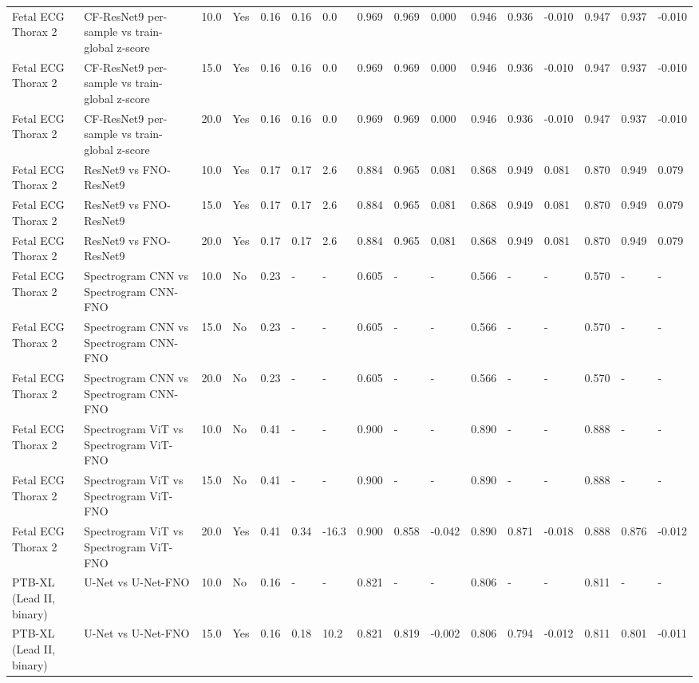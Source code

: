 \begin{longtable}{llllllllllllllll}
Fetal ECG Thorax 2 & CF-ResNet9 per-sample vs train-global z-score & 10.0 & Yes & 0.16 & 0.16 & 0.0 & 0.969 & 0.969 & 0.000 & 0.946 & 0.936 & -0.010 & 0.947 & 0.937 & -0.010 \\
Fetal ECG Thorax 2 & CF-ResNet9 per-sample vs train-global z-score & 15.0 & Yes & 0.16 & 0.16 & 0.0 & 0.969 & 0.969 & 0.000 & 0.946 & 0.936 & -0.010 & 0.947 & 0.937 & -0.010 \\
Fetal ECG Thorax 2 & CF-ResNet9 per-sample vs train-global z-score & 20.0 & Yes & 0.16 & 0.16 & 0.0 & 0.969 & 0.969 & 0.000 & 0.946 & 0.936 & -0.010 & 0.947 & 0.937 & -0.010 \\
Fetal ECG Thorax 2 & ResNet9 vs FNO-ResNet9 & 10.0 & Yes & 0.17 & 0.17 & 2.6 & 0.884 & 0.965 & 0.081 & 0.868 & 0.949 & 0.081 & 0.870 & 0.949 & 0.079 \\
Fetal ECG Thorax 2 & ResNet9 vs FNO-ResNet9 & 15.0 & Yes & 0.17 & 0.17 & 2.6 & 0.884 & 0.965 & 0.081 & 0.868 & 0.949 & 0.081 & 0.870 & 0.949 & 0.079 \\
Fetal ECG Thorax 2 & ResNet9 vs FNO-ResNet9 & 20.0 & Yes & 0.17 & 0.17 & 2.6 & 0.884 & 0.965 & 0.081 & 0.868 & 0.949 & 0.081 & 0.870 & 0.949 & 0.079 \\
Fetal ECG Thorax 2 & Spectrogram CNN vs Spectrogram CNN-FNO & 10.0 & No & 0.23 & - & - & 0.605 & - & - & 0.566 & - & - & 0.570 & - & - \\
Fetal ECG Thorax 2 & Spectrogram CNN vs Spectrogram CNN-FNO & 15.0 & No & 0.23 & - & - & 0.605 & - & - & 0.566 & - & - & 0.570 & - & - \\
Fetal ECG Thorax 2 & Spectrogram CNN vs Spectrogram CNN-FNO & 20.0 & No & 0.23 & - & - & 0.605 & - & - & 0.566 & - & - & 0.570 & - & - \\
Fetal ECG Thorax 2 & Spectrogram ViT vs Spectrogram ViT-FNO & 10.0 & No & 0.41 & - & - & 0.900 & - & - & 0.890 & - & - & 0.888 & - & - \\
Fetal ECG Thorax 2 & Spectrogram ViT vs Spectrogram ViT-FNO & 15.0 & No & 0.41 & - & - & 0.900 & - & - & 0.890 & - & - & 0.888 & - & - \\
Fetal ECG Thorax 2 & Spectrogram ViT vs Spectrogram ViT-FNO & 20.0 & Yes & 0.41 & 0.34 & -16.3 & 0.900 & 0.858 & -0.042 & 0.890 & 0.871 & -0.018 & 0.888 & 0.876 & -0.012 \\
PTB-XL (Lead II, binary) & U-Net vs U-Net-FNO & 10.0 & No & 0.16 & - & - & 0.821 & - & - & 0.806 & - & - & 0.811 & - & - \\
PTB-XL (Lead II, binary) & U-Net vs U-Net-FNO & 15.0 & Yes & 0.16 & 0.18 & 10.2 & 0.821 & 0.819 & -0.002 & 0.806 & 0.794 & -0.012 & 0.811 & 0.801 & -0.011 \\

\end{longtable}
